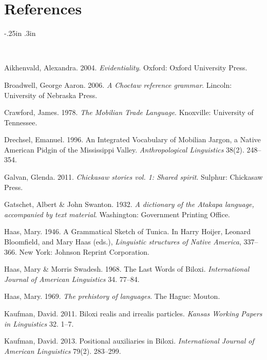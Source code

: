 \documentclass[output=paper]{LSP/langsci}
\begin{document}

\printbibliography[heading=subbibliography,notkeyword=this]

\section*{References}

\newenvironment{reflist} {\begin{list} {} {\listparindent -.25in
\leftmargin .3in} \item \ \vspace{-.3in} } {\end{list} }

\begin{reflist}

Aikhenvald, Alexandra. 2004. \emph{Evidentiality}. Oxford: Oxford University Press.

Broadwell, George Aaron. 2006. \emph{A Choctaw reference grammar}. Lincoln: University of Nebraska Press.

Crawford, James. 1978. \emph{The Mobilian Trade Language}. Knoxville: University of Tennessee.

Drechsel, Emanuel. 1996. An Integrated Vocabulary of Mobilian Jargon, a Native American Pidgin of the Mississippi Valley. \emph{Anthropological Linguistics} 38(2). 248--354.

Galvan, Glenda. 2011. \emph{Chickasaw stories vol. 1: Shared spirit}. Sulphur: Chickasaw Press.

Gatschet, Albert \& John Swanton. 1932. \emph{A dictionary of the Atakapa language, accompanied by text material}. Washington: Government Printing Office.

Haas, Mary. 1946. A Grammatical Sketch of Tunica. In Harry Hoijer, Leonard Bloomfield, and Mary Haas (eds.), \emph{Linguistic structures of Native America}, 337--366. New York: Johnson Reprint Corporation.

Haas, Mary \& Morris Swadesh. 1968. The Last Words of Biloxi. \emph{International Journal of American Linguistics} 34. 77--84.

Haas, Mary. 1969. \emph{The prehistory of languages}. The Hague: Mouton.

Kaufman, David. 2011. Biloxi realis and irrealis particles. \emph{Kansas Working Papers in Linguistics} 32. 1--7.

Kaufman, David. 2013. Positional auxiliaries in Biloxi. \emph{International Journal of American Linguistics} 79(2). 283--299.


\end{reflist}
\end{document}
